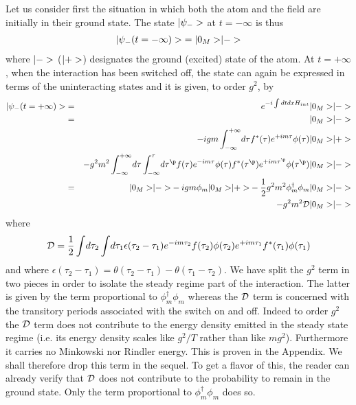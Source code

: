 Let us consider first the situation in which both
 the atom and the field are initially in their ground state. The state
$\mbox{$ \vert \psi_- > $}$
at $t=-\infty$ is
thus
\begin{eqnarray}
\mbox{$ \vert \psi_-(t=-\infty) > $} = \mbox{$ \vert 0_M > $} \mbox{$ \vert - > $}
\end{eqnarray}
where $\mbox{$ \vert - > $}$ ($\mbox{$ \vert + > $}$) designates the ground (excited)
state of the atom.
At $t=+\infty$, when the interaction has been switched off, the state
can again be expressed in terms of the uninteracting states and it is
given, to order $g^2$,
by
\begin{eqnarray}
\ket{\psi_-(t=+\infty)} &=&  e^{-i \int dt dx H_{int}}\ket{0_M} \ket{-}
\nonumber \\
&=& \ket{0_M} \ket{-}\nonumber\\
& & -ig m \int_{-\infty}^{+\infty}\!
d\tau   f^*(\tau) e^{+im\tau}  \phi(\tau)\ket{0_M} \ket{+}\nonumber \\
& & - g^2 m^2
\int_{-\infty}^{+\infty}\!
d\tau
\int_{-\infty}^{\tau}\!
d\tau^\p f(\tau) e^{-im\tau}  \phi(\tau)
  f^*(\tau^\p) e^{+im\tau^\p}  \phi(\tau^\p)\ket{0_M}
\ket{-}\nonumber \\
&=& \ket{0_M} \ket{-}  -ig m \phi_m \ket{0_M}\ket{+}- {1 \over 2} g^2 m^2
\phi_m^\dagger \phi_m \ket{0_M}\ket{-}
\nonumber \\& &-  g^2 m^2
{\cal D}  \ket{0_M}\ket{-}
\label{state}
\end{eqnarray}
where
\begin{equation}
{\cal D} = {1 \over 2}
\int \! d\tau_2
\int \! d \tau_1 \epsilon(\tau_2 - \tau_1) e^{-i m \tau_2} f(\tau_2)
\phi(\tau_2) e^{+i m \tau_1} f^*(\tau_1) \phi(\tau_1)
\label{calD}
\end{equation}
and where $\epsilon(\tau_2 - \tau_1) = \theta(\tau_2 - \tau_1) -
\theta(\tau_1 - \tau_2 )$.
We have split the $g^2$ term in two pieces
in order to isolate the steady regime
part of the interaction.
The latter is given by the term proportional
to $\phi_m^\dagger \phi_m$
whereas the ${\cal {D}}$ term is concerned with the transitory periods
associated with the switch on and off. Indeed to order $g^2$ the  ${\cal D}$
term
does not contribute to the energy density emitted in the
steady state regime (i.e. its energy density scales like $g^2/T$ rather than
like $mg^2$).
Furthermore it carries no Minkowski nor Rindler energy. This is
proven
in the Appendix. We shall therefore drop this term
in the sequel.
To get a flavor of this, the reader can
already verify that $\cal{D}$ does not contribute to the probability
to remain in the ground state. Only the term proportional to
$\phi_m^\dagger \phi_m$ does so.

